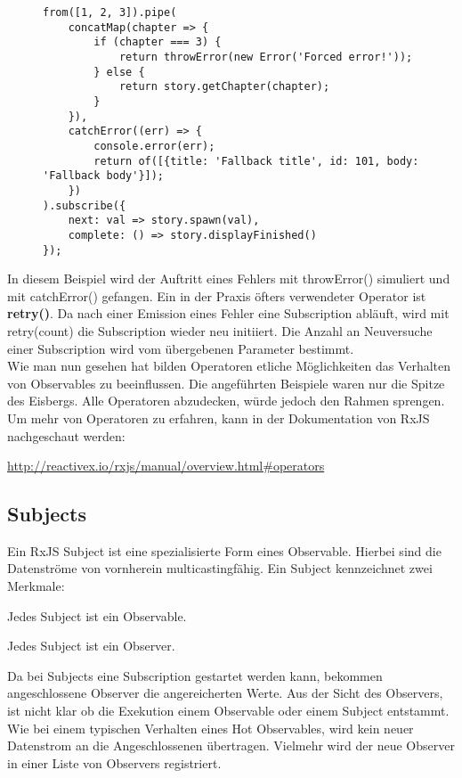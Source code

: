 \begin{figure}[H]
\begin{lstlisting}[basicstyle=\small]
from([1, 2, 3]).pipe(
    concatMap(chapter => {
        if (chapter === 3) {
            return throwError(new Error('Forced error!'));
        } else {
            return story.getChapter(chapter);
        }
    }),
    catchError((err) => {
        console.error(err);
        return of([{title: 'Fallback title', id: 101, body: 'Fallback body'}]);
    })
).subscribe({
    next: val => story.spawn(val),
    complete: () => story.displayFinished()
});
\end{lstlisting}
\end{figure}

\noindent
In diesem Beispiel wird der Auftritt eines Fehlers mit throwError() simuliert und mit catchError() gefangen. Ein in der Praxis öfters verwendeter Operator ist \textbf{retry()}. Da nach einer Emission eines Fehler eine Subscription abläuft, wird mit retry(count) die Subscription wieder neu initiiert. Die Anzahl an Neuversuche einer Subscription wird vom übergebenen Parameter bestimmt.\\

\noindent
Wie man nun gesehen hat bilden Operatoren etliche Möglichkeiten das Verhalten von Observables zu beeinflussen. Die angeführten Beispiele waren nur die Spitze des Eisbergs. Alle Operatoren abzudecken, würde jedoch den Rahmen sprengen. Um mehr von Operatoren zu erfahren, kann in der Dokumentation von RxJS nachgeschaut werden:

\begin{center}
\url{http://reactivex.io/rxjs/manual/overview.html#operators} 
\end{center}

\subsection{Subjects}

Ein RxJS Subject ist eine spezialisierte Form eines Observable. Hierbei sind die Datenströme von vornherein multicastingfähig. Ein Subject kennzeichnet zwei Merkmale:

\begin{description}
\item Jedes Subject ist ein Observable.
\item Jedes Subject ist ein Observer.
\end{description}

\noindent
Da bei Subjects eine Subscription gestartet werden kann, bekommen angeschlossene Observer die angereicherten Werte. Aus der Sicht des Observers, ist nicht klar ob die Exekution einem Observable oder einem Subject entstammt. Wie bei einem typischen Verhalten eines Hot Observables, wird kein neuer Datenstrom an die Angeschlossenen übertragen. Vielmehr wird der neue Observer in einer Liste von Observers registriert.\\


